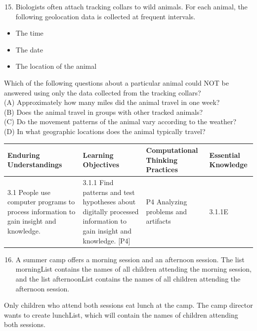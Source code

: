 \documentclass[10pt]{article}
\begin{document}
\begin{enumerate}
  \setcounter{enumi}{14}
  \item Biologists often attach tracking collars to wild animals. For each animal, the following geolocation data is collected at frequent intervals.
\end{enumerate}

\begin{itemize}
  \item The time
  \item The date
  \item The location of the animal
\end{itemize}

Which of the following questions about a particular animal could NOT be answered using only the data collected from the tracking collars?\\
(A) Approximately how many miles did the animal travel in one week?\\
(B) Does the animal travel in groups with other tracked animals?\\
(C) Do the movement patterns of the animal vary according to the weather?\\
(D) In what geographic locations does the animal typically travel?

\begin{center}
\begin{tabular}{|l|l|l|l|}
\hline
Enduring Understandings & Learning Objectives & Computational Thinking Practices & Essential Knowledge \\
\hline
3.1 People use computer programs to process information to gain insight and knowledge. & 3.1.1 Find patterns and test hypotheses about digitally processed information to gain insight and knowledge. [P4] & P4 Analyzing problems and artifacts & 3.1.1E \\
\hline
\end{tabular}
\end{center}

\begin{enumerate}
  \setcounter{enumi}{15}
  \item A summer camp offers a morning session and an afternoon session. The list morningList contains the names of all children attending the morning session, and the list afternoonList contains the names of all children attending the afternoon session.
\end{enumerate}

Only children who attend both sessions eat lunch at the camp. The camp director wants to create lunchList, which will contain the names of children attending both sessions.
\end{document}
